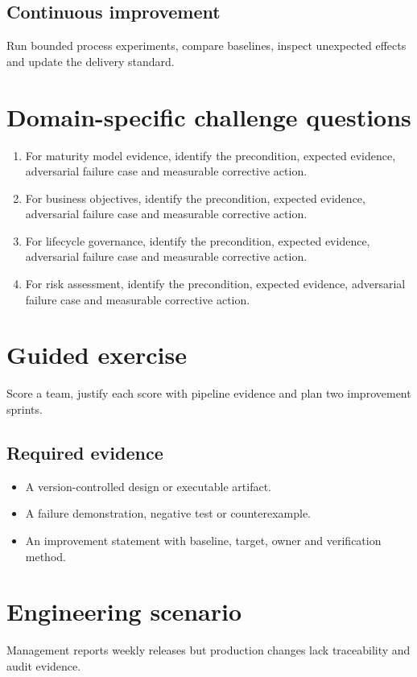\documentclass[10pt,letterpaper]{article}
\begin{document}
\subsection{Continuous improvement}
Run bounded process experiments, compare baselines, inspect unexpected effects and update the delivery standard.

\section{Domain-specific challenge questions}
\begin{enumerate}
\item For maturity model evidence, identify the precondition, expected evidence, adversarial failure case and measurable corrective action.
\item For business objectives, identify the precondition, expected evidence, adversarial failure case and measurable corrective action.
\item For lifecycle governance, identify the precondition, expected evidence, adversarial failure case and measurable corrective action.
\item For risk assessment, identify the precondition, expected evidence, adversarial failure case and measurable corrective action.
\end{enumerate}
\section{Guided exercise}
Score a team, justify each score with pipeline evidence and plan two improvement sprints.

\subsection{Required evidence}
\begin{itemize}
\item A version-controlled design or executable artifact.
\item A failure demonstration, negative test or counterexample.
\item An improvement statement with baseline, target, owner and verification method.
\end{itemize}


\section{Engineering scenario}
Management reports weekly releases but production changes lack traceability and audit evidence.
\end{document}
